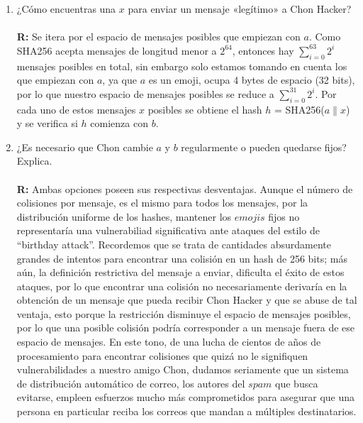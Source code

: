 \documentclass[14pt]{article}
\begin{document}
\begin{enumerate}[label=\alph*)]
\item ¿Cómo encuentras una $x$ para enviar un mensaje «legítimo» a Chon Hacker? \\ \\
\textbf{R:} Se itera por el espacio de mensajes posibles que empiezan con $a$. Como SHA256 acepta mensajes de longitud menor a $2^{64}$, entonces hay $\sum_{i = 0}^{63} 2^i$ mensajes posibles en total, sin embargo solo estamos tomando en cuenta los que empiezan con $a$, ya que $a$ es un emoji, ocupa 4 bytes de espacio (32 bits), por lo que nuestro espacio de mensajes posibles se reduce a $\sum_{i = 0}^{31} 2^i$. Por cada uno de estos mensajes $x$ posibles se obtiene el hash $h$ = SHA256($a \parallel x$)  y se verifica si $h$ comienza con $b$.

\item ¿Es necesario que Chon cambie $a$ y $b$ regularmente o pueden quedarse fijos? Explica. \\ \\
  \textbf{R:} Ambas opciones poseen sus respectivas desventajas. Aunque el número de colisiones por mensaje, es el mismo para todos los mensajes, por la distribución uniforme de los hashes, mantener
  los $emojis$ fijos no representaría una vulnerabiliad significativa ante ataques del estilo de ``birthday attack''. Recordemos que se trata de cantidades absurdamente grandes de intentos para encontrar
  una colisión en un hash de 256 bits; más aún, la definición restrictiva del mensaje a enviar, dificulta el éxito de estos ataques, por lo que encontrar una colisión no necesariamente derivaría en la obtención de un mensaje que pueda recibir Chon Hacker y que se abuse de tal ventaja, esto porque la restricción disminuye el espacio de mensajes posibles, por lo que una posible colisión podría corresponder
  a un mensaje fuera de ese espacio de mensajes. En este tono, de una lucha  de cientos de años de procesamiento para encontrar colisiones que quizá no le signifiquen vulnerabilidades a nuestro amigo Chon, dudamos seriamente que un sistema de distribución automático de correo, los autores del $spam$ que busca evitarse,
  empleen esfuerzos mucho más comprometidos para asegurar que una persona en particular reciba los correos que mandan a múltiples destinatarios.\\


\end{enumerate}
\end{document}
